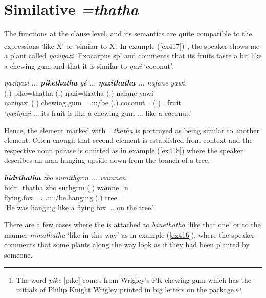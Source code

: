 \section{Similative \emph{=thatha}} \label{similcase}

The   functions at the clause level, and its semantics are quite compatible to the  expressions `like X' or `similar to X'. In example (\ref{ex417})\footnote{The word \emph{pike} [pıke] comes from Wrigley's PK\textsuperscript{\textregistered} chewing gum which has the initials of Philip Knight Wrigley printed in big letters on the package.}, the speaker shows me a plant called \emph{ŋaziŋazi} `Exocarpus sp' and comments that its fruits taste a bit like a chewing gum and that it is similar to \emph{ŋazi} `coconut'.

\begin{exe}
	\ex \emph{ŋaziŋazi ... \textbf{pikethatha} yé ... \textbf{ŋazithatha} ... nafane yawi.}\\
	 (.) pike=thatha  (.) ŋazi=thatha (.) nafane yawi\\
	ŋaziŋazi (.) chewing.gum=\Simil{} \Tsg.\Masc:\Sbj:\Nonpast:\Ipfv/be (.) coconut=\Simil{} (.) \Tsg.\Poss{} fruit\\ 
	\trans `\emph{ŋaziŋazi} ... its fruit is like a chewing gum ... like a coconut.'\\
	\label{ex417}
\end{exe}

Hence, the element marked with \emph{=thatha} is portrayed as being similar to another element. Often enough that second element is established from context and the respective noun phrase is omitted as in example (\ref{ex418}) where the speaker describes an man hanging upside down from the branch of a tree.

\begin{exe}
	\ex \emph{\textbf{bidrthatha} zbo sumithgrm ... wämnen.}\\
	\gll bidr=thatha zbo suthgrm (.) wämne=n\\
	{{flying.fox}=\Simil{}} {\Prox.\All{}} \Tsg.\Masc:\Sbj:\Pst:\Dur:\Stat/be.hanging (.) tree=\Loc\\
	\trans `He was hanging like a flying fox ... on the tree.'
	\label{ex418}
\end{exe}

There are a few cases where the   is attached to   \emph{bänethatha} `like that one' or to the manner  \emph{nimathatha} `like in this way' as in example (\ref{ex416}), where the speaker comments that some plants along the way look as if they had been planted by someone.

